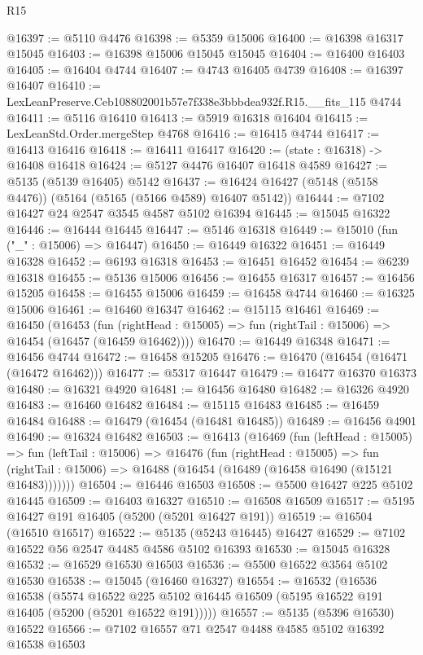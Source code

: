 \begin{lexlean}{R15}
\begin{coremodule}
{{{{{{{{{{{@16397 := @5110 @4476
@16398 := @5359 @15006
@16400 := @16398 @16317 @15045
@16403 := @16398 @15006 @15045 @15045
@16404 := @16400 @16403
@16405 := @16404 @4744
@16407 := @4743 @16405 @4739
@16408 := @16397 @16407
@16410 := LexLeanPreserve.Ceb108802001b57e7f338e3bbbdea932f.R15.__fits_115 @4744
@16411 := @5116 @16410
@16413 := @5919 @16318 @16404
@16415 := LexLeanStd.Order.mergeStep @4768
@16416 := @16415 @4744
@16417 := @16413 @16416
@16418 := @16411 @16417
@16420 := (state : @16318) -> @16408 @16418
@16424 := @5127 @4476 @16407 @16418 @4589
@16427 := @5135 (@5139 @16405) @5142
@16437 := @16424 @16427 (@5148 (@5158 @4476)) (@5164 (@5165 (@5166 @4589) @16407 @5142))
@16444 := @7102 @16427 @24 @2547 @3545 @4587 @5102 @16394
@16445 := @15045 @16322
@16446 := @16444 @16445
@16447 := @5146 @16318
@16449 := @15010 (fun ("_" : @15006) => @16447)
@16450 := @16449 @16322
@16451 := @16449 @16328
@16452 := @6193 @16318
@16453 := @16451 @16452
@16454 := @6239 @16318
@16455 := @5136 @15006
@16456 := @16455 @16317
@16457 := @16456 @15205
@16458 := @16455 @15006
@16459 := @16458 @4744
@16460 := @16325 @15006
@16461 := @16460 @16347
@16462 := @15115 @16461
@16469 := @16450
    (@16453
      (fun (rightHead : @15005) => fun (rightTail : @15006) => @16454 (@16457 (@16459 @16462))))
@16470 := @16449 @16348
@16471 := @16456 @4744
@16472 := @16458 @15205
@16476 := @16470 (@16454 (@16471 (@16472 @16462)))
@16477 := @5317 @16447
@16479 := @16477 @16370 @16373
@16480 := @16321 @4920
@16481 := @16456 @16480
@16482 := @16326 @4920
@16483 := @16460 @16482
@16484 := @15115 @16483
@16485 := @16459 @16484
@16488 := @16479 (@16454 (@16481 @16485))
@16489 := @16456 @4901
@16490 := @16324 @16482
@16503 := @16413
    (@16469
      (fun (leftHead : @15005) =>
      fun (leftTail : @15006) =>
      @16476
        (fun (rightHead : @15005) =>
        fun (rightTail : @15006) => @16488 (@16454 (@16489 (@16458 @16490 (@15121 @16483)))))))
@16504 := @16446 @16503
@16508 := @5500 @16427 @225 @5102 @16445
@16509 := @16403 @16327
@16510 := @16508 @16509
@16517 := @5195 @16427 @191 @16405 (@5200 (@5201 @16427 @191))
@16519 := @16504 (@16510 @16517)
@16522 := @5135 (@5243 @16445) @16427
@16529 := @7102 @16522 @56 @2547 @4485 @4586 @5102 @16393
@16530 := @15045 @16328
@16532 := @16529 @16530 @16503
@16536 := @5500 @16522 @3564 @5102 @16530
@16538 := @15045 (@16460 @16327)
@16554 := @16532
    (@16536
      @16538
      (@5574
        @16522
        @225
        @5102
        @16445
        @16509
        (@5195 @16522 @191 @16405 (@5200 (@5201 @16522 @191)))))
@16557 := @5135 (@5396 @16530) @16522
@16566 := @7102 @16557 @71 @2547 @4488 @4585 @5102 @16392 @16538 @16503
}}}}}}}}}}}
\end{coremodule}
\end{lexlean}
